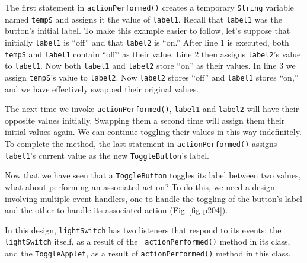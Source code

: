 
\noindent The first statement in {\tt actionPerformed()} creates a temporary
{\tt String} variable named {\tt tempS} and assigns it the value of
{\tt label1}. Recall that \mbox{\tt label1} was the button's initial
label.  To make this example easier to follow, let's suppose that
initially {\tt label1} is ``off'' and that {\tt label2} is ``on.'' 
After line 1 is executed, both {\tt tempS} and {\tt label1}
contain ``off'' as their value.  Line 2 then assigns {\tt label2}'s
value to {\tt label1}.  Now both {\tt label1} and {\tt label2}
store ``on'' as their values.   In line 3 we assign {\tt tempS}'s value
to {\tt label2}. Now {\tt label2} stores ``off'' and {\tt label1}
stores ``on,'' and we have effectively swapped their original values.

The next time we invoke {\tt actionPerformed()}, {\tt label1}
and {\tt label2} will have their opposite values initially.  
Swapping them a second time will assign them their initial values
again.  We can continue toggling their values in this way
indefinitely.  To complete the method, the last statement in
{\tt actionPerformed()} assigns {\tt label1}'s current value as the new
{\tt ToggleButton}'s label.

Now that we have seen that a {\tt ToggleButton} toggles its label
between two values, what about performing an associated action?
 To do this, we need a design
involving multiple event handlers, one to handle the toggling of the
button's label and the other to handle its associated action
(Fig~\ref{fig-p204}).
\begin{figure}[h!]
\end{figure}
In this design, {\tt lightSwitch} has two listeners that respond to
its events: the {\tt lightSwitch} itself, as a result of the {\tt
actionPerformed()} method in its class, and the {\tt ToggleApplet}, as
a result of {\tt actionPerformed()} method in this class.


